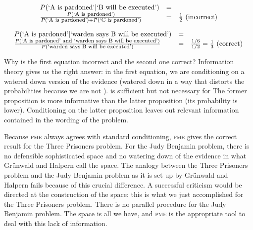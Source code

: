 \documentclass[phd,12pt,oneside]{ubcthesis}
\begin{document}
\begin{equation}
  \label{eq:ooshooth}
  \begin{array}{lcr}
    P(\mbox{`A is pardoned'}|\mbox{`B will be executed'})&=& \\
    \frac{P(\mbox{\footnotesize `A is pardoned'})}{P(\mbox{\footnotesize `A is
    pardoned'})+P(\mbox{\footnotesize `C is pardoned'})}&=&\frac{1}{2}\mbox{ (incorrect)} \\
  \end{array}
\end{equation}

\begin{equation}
  \label{eq:ailosahz}
  \begin{array}{lcr}
    P(\mbox{`A is pardoned'}|\mbox{`warden says B will be
    executed'})&=& \\
    \frac{P(\mbox{\footnotesize `A is pardoned' and `warden says B will
    be executed'})}{P(\mbox{\footnotesize `warden says B will be
    executed'})}&=&\frac{1/6}{1/2}=\frac{1}{3}\mbox{ (correct)} \\
  \end{array}
\end{equation}

\nial Why is the first equation incorrect and the second one correct?
Information theory gives us the right answer: in the first equation,
we are conditioning on a watered down version of the evidence (watered
down in a way that distorts the probabilities because we are not
). 
is sufficient but not necessary for  The
former proposition is more informative than the latter proposition
(its probability is lower). Conditioning on the latter proposition
leaves out relevant information contained in the wording of the
problem.

Because \textsc{pme} always agrees with standard conditioning,
\textsc{pme} gives the correct result for the Three Prisoners
problem. For the Judy Benjamin problem, there is no defensible
sophisticated space and no watering down of the evidence in what
Gr{\"u}nwald and Halpern call the  space. The analogy
between the Three Prisoners problem and the Judy Benjamin problem as
it is set up by Gr{\"u}nwald and Halpern fails because of this crucial
difference. A successful criticism would be directed at the
construction of the  space: this is what we just
accomplished for the Three Prisoners problem. There is no parallel
procedure for the Judy Benjamin problem. The  space is
all we have, and \textsc{pme} is the appropriate tool to deal with
this lack of information.
\end{document}
